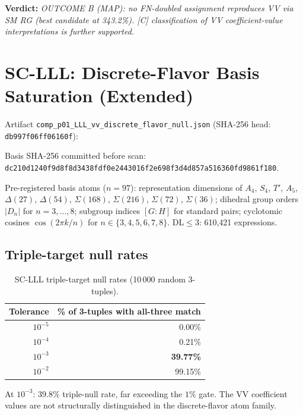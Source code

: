 \documentclass[11pt]{article}
\theoremstyle{remark}
\begin{document}
\textbf{Verdict:} \textit{OUTCOME B (MAP): no FN-doubled assignment
reproduces VV via SM RG (best candidate at 343.2\%).  [C] classification
of VV coefficient-value interpretations is further supported.}

\section{SC-LLL: Discrete-Flavor Basis Saturation (Extended)}
\label{sec:si_lll}

Artifact \texttt{comp\_p01\_LLL\_vv\_discrete\_flavor\_null.json}
(SHA-256 head: \texttt{db997f06ff06160f}):

{\sloppy Basis SHA-256 committed before scan:
\texttt{dc210d1240f9d8f8d3438fdf}\allowbreak\texttt{0e2443016f2e698f3d4d857a}\allowbreak\texttt{516360fd9861f180}.\par}

Pre-registered basis atoms ($n=97$): representation dimensions of $A_4$, $S_4$,
$T'$, $A_5$, $\Delta(27)$, $\Delta(54)$, $\Sigma(168)$, $\Sigma(216)$,
$\Sigma(72)$, $\Sigma(36)$; dihedral group orders $|D_n|$ for $n=3,\ldots,8$;
subgroup indices $[G:H]$ for standard pairs; cyclotomic cosines
$\cos(2\pi k/n)$ for $n\in\{3,4,5,6,7,8\}$.
DL$\leq3$: 610{,}421 expressions.

\subsection{Triple-target null rates}

\begin{table}[ht]
\centering
\caption{SC-LLL triple-target null rates (10\,000 random 3-tuples).}
\begin{tabular}{rr}
\toprule
Tolerance & \% of 3-tuples with all-three match \\
\midrule
$10^{-5}$ & 0.00\% \\
$10^{-4}$ & 0.21\% \\
$10^{-3}$ & \textbf{39.77\%} \\
$10^{-2}$ & 99.15\% \\
\bottomrule
\end{tabular}
\end{table}

At $10^{-3}$: $39.8\%$ triple-null rate, far exceeding the $1\%$ gate.
The VV coefficient values are not structurally distinguished in the
discrete-flavor atom family.
\end{document}
